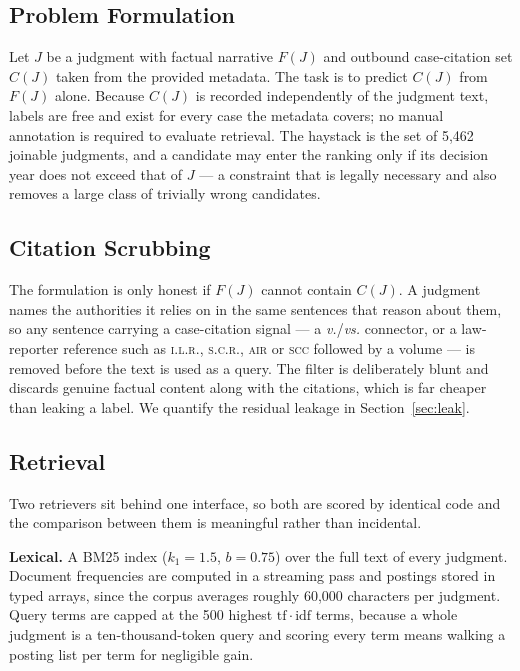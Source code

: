 \documentclass[10pt,conference]{IEEEtran}
\begin{document}
\subsection{Problem Formulation}

Let $J$ be a judgment with factual narrative $F(J)$ and outbound case-citation set $C(J)$
taken from the provided metadata. The task is to predict $C(J)$ from $F(J)$ alone. Because
$C(J)$ is recorded independently of the judgment text, labels are free and exist for every
case the metadata covers; no manual annotation is required to evaluate retrieval. The
haystack is the set of 5{,}462 joinable judgments, and a candidate may enter the ranking only
if its decision year does not exceed that of $J$ --- a constraint that is legally necessary
and also removes a large class of trivially wrong candidates.

\subsection{Citation Scrubbing}

The formulation is only honest if $F(J)$ cannot contain $C(J)$. A judgment names the
authorities it relies on in the same sentences that reason about them, so any sentence
carrying a case-citation signal --- a \emph{v.}/\emph{vs.} connector, or a law-reporter
reference such as \textsc{i.l.r.}, \textsc{s.c.r.}, \textsc{air} or \textsc{scc} followed by
a volume --- is removed before the text is used as a query. The filter is deliberately blunt
and discards genuine factual content along with the citations, which is far cheaper than
leaking a label. We quantify the residual leakage in Section~\ref{sec:leak}.

\subsection{Retrieval}

Two retrievers sit behind one interface, so both are scored by identical code and the
comparison between them is meaningful rather than incidental.

\textbf{Lexical.} A BM25 index ($k_1{=}1.5$, $b{=}0.75$) over the full text of every
judgment. Document frequencies are computed in a streaming pass and postings stored in
typed arrays, since the corpus averages roughly 60{,}000 characters per judgment. Query
terms are capped at the 500 highest $\mathrm{tf}\cdot\mathrm{idf}$ terms, because a whole
judgment is a ten-thousand-token query and scoring every term means walking a posting list
per term for negligible gain.
\end{document}
